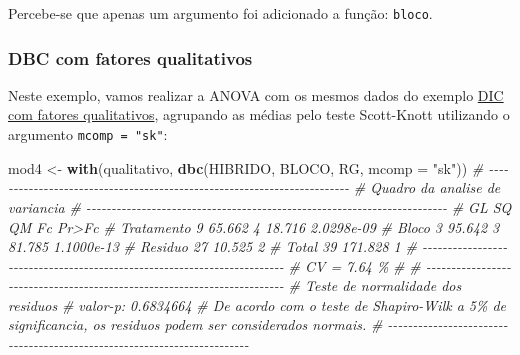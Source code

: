 \documentclass[
]{book}
\newenvironment{Shaded}{\begin{snugshade}}{\end{snugshade}}
\newcommand{\CommentTok}[1]{\textcolor[rgb]{0.56,0.35,0.01}{\textit{#1}}}
\newcommand{\DataTypeTok}[1]{\textcolor[rgb]{0.13,0.29,0.53}{#1}}
\newcommand{\KeywordTok}[1]{\textcolor[rgb]{0.13,0.29,0.53}{\textbf{#1}}}
\newcommand{\NormalTok}[1]{#1}
\newcommand{\StringTok}[1]{\textcolor[rgb]{0.31,0.60,0.02}{#1}}
\numberwithin{equation}{section}
\begin{document}
Percebe-se que apenas um argumento foi adicionado a função: \texttt{bloco}.

\hypertarget{dbc-com-fatores-qualitativos}{%
\subsubsection{DBC com fatores qualitativos}\label{dbc-com-fatores-qualitativos}}

Neste exemplo, vamos realizar a ANOVA com os mesmos dados do exemplo \hypertarget{DBCQUALI}{\hyperlink{DICQUALI}{DIC com fatores qualitativos}}, agrupando as médias pelo teste Scott-Knott utilizando o argumento \texttt{mcomp\ =\ "sk"}:

\begin{Shaded}
\begin{Highlighting}[]
\NormalTok{mod4 \textless{}{-}}\StringTok{ }\KeywordTok{with}\NormalTok{(qualitativo, }\KeywordTok{dbc}\NormalTok{(HIBRIDO, BLOCO, RG, }\DataTypeTok{mcomp =} \StringTok{"sk"}\NormalTok{))}
\CommentTok{\# {-}{-}{-}{-}{-}{-}{-}{-}{-}{-}{-}{-}{-}{-}{-}{-}{-}{-}{-}{-}{-}{-}{-}{-}{-}{-}{-}{-}{-}{-}{-}{-}{-}{-}{-}{-}{-}{-}{-}{-}{-}{-}{-}{-}{-}{-}{-}{-}{-}{-}{-}{-}{-}{-}{-}{-}{-}{-}{-}{-}{-}{-}{-}{-}{-}{-}{-}{-}{-}{-}{-}{-}}
\CommentTok{\# Quadro da analise de variancia}
\CommentTok{\# {-}{-}{-}{-}{-}{-}{-}{-}{-}{-}{-}{-}{-}{-}{-}{-}{-}{-}{-}{-}{-}{-}{-}{-}{-}{-}{-}{-}{-}{-}{-}{-}{-}{-}{-}{-}{-}{-}{-}{-}{-}{-}{-}{-}{-}{-}{-}{-}{-}{-}{-}{-}{-}{-}{-}{-}{-}{-}{-}{-}{-}{-}{-}{-}{-}{-}{-}{-}{-}{-}{-}{-}}
\CommentTok{\#            GL      SQ QM     Fc      Pr\textgreater{}Fc}
\CommentTok{\# Tratamento  9  65.662  4 18.716 2.0298e{-}09}
\CommentTok{\# Bloco       3  95.642  3 81.785 1.1000e{-}13}
\CommentTok{\# Residuo    27  10.525  2                  }
\CommentTok{\# Total      39 171.828  1                  }
\CommentTok{\# {-}{-}{-}{-}{-}{-}{-}{-}{-}{-}{-}{-}{-}{-}{-}{-}{-}{-}{-}{-}{-}{-}{-}{-}{-}{-}{-}{-}{-}{-}{-}{-}{-}{-}{-}{-}{-}{-}{-}{-}{-}{-}{-}{-}{-}{-}{-}{-}{-}{-}{-}{-}{-}{-}{-}{-}{-}{-}{-}{-}{-}{-}{-}{-}{-}{-}{-}{-}{-}{-}{-}{-}}
\CommentTok{\# CV = 7.64 \%}
\CommentTok{\# }
\CommentTok{\# {-}{-}{-}{-}{-}{-}{-}{-}{-}{-}{-}{-}{-}{-}{-}{-}{-}{-}{-}{-}{-}{-}{-}{-}{-}{-}{-}{-}{-}{-}{-}{-}{-}{-}{-}{-}{-}{-}{-}{-}{-}{-}{-}{-}{-}{-}{-}{-}{-}{-}{-}{-}{-}{-}{-}{-}{-}{-}{-}{-}{-}{-}{-}{-}{-}{-}{-}{-}{-}{-}{-}{-}}
\CommentTok{\# Teste de normalidade dos residuos }
\CommentTok{\# valor{-}p:  0.6834664 }
\CommentTok{\# De acordo com o teste de Shapiro{-}Wilk a 5\% de significancia, os residuos podem ser considerados normais.}
\CommentTok{\# {-}{-}{-}{-}{-}{-}{-}{-}{-}{-}{-}{-}{-}{-}{-}{-}{-}{-}{-}{-}{-}{-}{-}{-}{-}{-}{-}{-}{-}{-}{-}{-}{-}{-}{-}{-}{-}{-}{-}{-}{-}{-}{-}{-}{-}{-}{-}{-}{-}{-}{-}{-}{-}{-}{-}{-}{-}{-}{-}{-}{-}{-}{-}{-}{-}{-}{-}{-}{-}{-}{-}{-}}

\end{Highlighting}
\end{Shaded}
\end{document}
